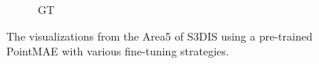 \begin{figure}
\begin{subfigure}{0.235\textwidth}
        \caption{GT}
        \label{fig:s3dis6}
    \end{subfigure}
    \caption{The visualizations from the Area5 of S3DIS using a pre-trained PointMAE with various fine-tuning strategies.}
    \label{fig:s3dis}
\end{figure}